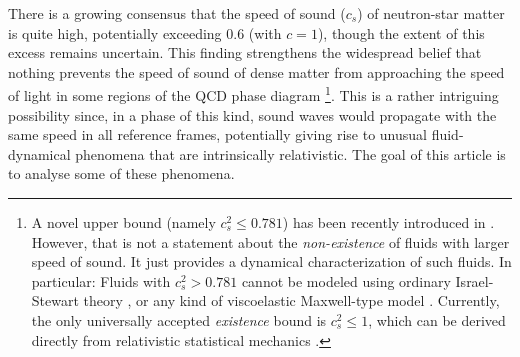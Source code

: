 \documentclass[a4paper, amsfonts, amssymb, amsmath, reprint, showkeys, nofootinbib, twoside,notitlepage,onecolumn]{revtex4-2}
\theoremstyle{definition}
\theoremstyle{theorem}
\theoremstyle{corollary}
\begin{document}
There is a growing consensus that the speed of sound ($c_s$) of neutron-star matter is quite high, potentially exceeding 0.6 \cite{Altiparmak:2022bke,Koehn:2024set} (with $c=1$), though the extent of this excess remains uncertain. This finding strengthens the widespread belief that nothing prevents the speed of sound of dense matter from approaching the speed of light in some regions of the QCD phase diagram \cite{Zeldovich:1961sbr,SonPionCondensate2000by,MooreSpeedofSound2024gmt}\footnote{A novel upper bound (namely $c_s^2 \leq 0.781$) has been recently introduced in \cite{Hippert:2024hum}. However, that is not a statement about the \textit{non-existence} of fluids with larger speed of sound. It just provides a dynamical characterization of such fluids. In particular: Fluids with $c_s^2 > 0.781$ cannot be modeled using ordinary Israel-Stewart theory \cite{Israel_Stewart_1979,Hishcock1983}, or any kind of viscoelastic Maxwell-type model \cite{GavassinoGENERIC2022,GavassinoUniversalityI2023}. Currently, the only universally accepted \textit{existence} bound is $c_s^2\leq 1$, which can be derived directly from relativistic statistical mechanics \cite{GavassinoCausality2021,HellerBounds2022ejw,GavassinoBounds2023}.}. This is a rather intriguing possibility since, in a phase of this kind, sound waves would propagate with the same speed in all reference frames, potentially giving rise to unusual fluid-dynamical phenomena that are intrinsically relativistic. The goal of this article is to analyse some of these phenomena.
\end{document}
